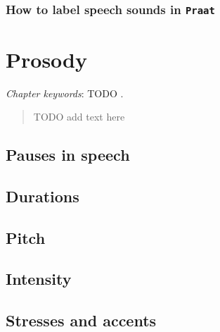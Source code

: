 \documentclass[
]{book}
\begin{document}
\subsection{\texorpdfstring{How to label speech sounds in \texttt{Praat}}{How to label speech sounds in Praat}}\label{how-to-label-speech-sounds-in-praat}

\chapter{Prosody}\label{ch-prosody}

\emph{Chapter keywords}: TODO .

\begin{quote}
TODO add text here
\end{quote}

\section{Pauses in speech}\label{pauses-in-speech}

\section{Durations}\label{durations}

\section{Pitch}\label{pitch}

\section{Intensity}\label{intensity}

\section{Stresses and accents}\label{stresses-and-accents}

  
\end{document}
